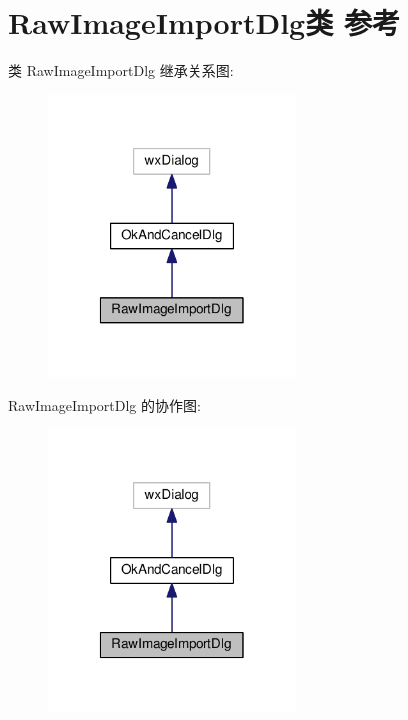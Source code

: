\hypertarget{class_raw_image_import_dlg}{\section{Raw\+Image\+Import\+Dlg类 参考}
\label{class_raw_image_import_dlg}
}


类 Raw\+Image\+Import\+Dlg 继承关系图\+:
\nopagebreak
\begin{figure}[H]
\begin{center}
\leavevmode
\includegraphics[width=186pt]{class_raw_image_import_dlg__inherit__graph}
\end{center}
\end{figure}


Raw\+Image\+Import\+Dlg 的协作图\+:
\nopagebreak
\begin{figure}[H]
\begin{center}
\leavevmode
\includegraphics[width=186pt]{class_raw_image_import_dlg__coll__graph}
\end{center}
\end{figure}
